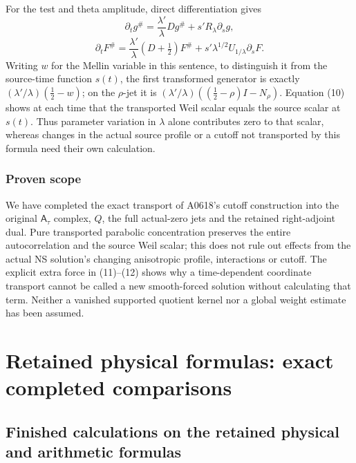 \documentclass[10pt,a4paper,oneside]{report}
\begin{document}
For the test and theta amplitude, direct differentiation gives \[
\partial_tg^\#=\frac{\lambda'}{\lambda}Dg^\#+s'R_\lambda\partial_sg,
\] \[
\partial_tF^\#=\frac{\lambda'}{\lambda}(D+\tfrac12)F^\#+s'\lambda^{1/2}U_{1/\lambda}\partial_sF.
\tag{13}
\] Writing \(w\) for the Mellin variable in this sentence, to
distinguish it from the source-time function \(s(t)\), the first
transformed generator is exactly \((\lambda'/\lambda)(\tfrac12-w)\); on
the \(\rho\)-jet it is \((\lambda'/\lambda)((\tfrac12-\rho)I-N_\rho)\).
Equation (10) shows at each time that the transported Weil scalar equals
the source scalar at \(s(t)\). Thus parameter variation in \(\lambda\)
alone contributes zero to that scalar, whereas changes in the actual
source profile or a cutoff not transported by this formula need their
own calculation.

\subsection{Proven scope}\label{proof09:proven-scope}

We have completed the exact transport of A0618's cutoff construction
into the original \(\mathsf A_\tau\) complex, \(Q\), the full
actual-zero jets and the retained right-adjoint dual. Pure transported
parabolic concentration preserves the entire autocorrelation and the
source Weil scalar; this does not rule out effects from the actual NS
solution's changing anisotropic profile, interactions or cutoff. The
explicit extra force in (11)--(12) shows why a time-dependent coordinate
transport cannot be called a new smooth-forced solution without
calculating that term. Neither a vanished supported quotient kernel nor
a global weight estimate has been assumed.


\endgroup
\clearpage
\chapter{Retained physical formulas: exact completed comparisons}
\begingroup
\section{Finished calculations on the retained physical and arithmetic
formulas}\label{proof10:finished-calculations-on-the-retained-physical-and-arithmetic-formulas}
\end{document}
